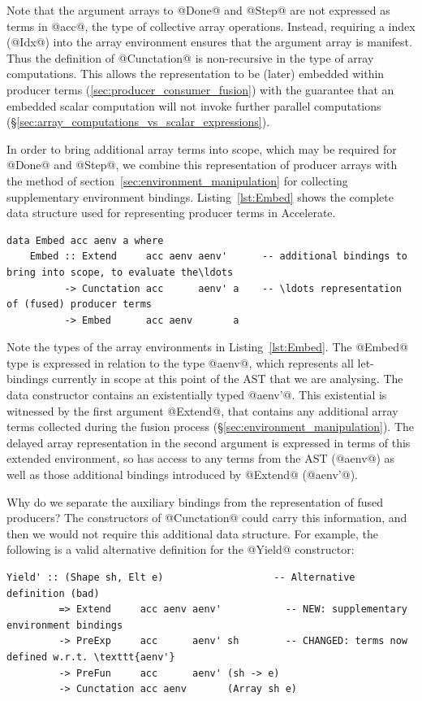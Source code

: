 Note that the argument arrays to @Done@ and @Step@ are not expressed as terms in
@acc@, the type of collective array operations. Instead, requiring a  index (@Idx@) into the array environment ensures that the argument array
is manifest. Thus the definition of @Cunctation@ is non-recursive in the type of
array computations. This allows the representation to be (later) embedded within
producer terms (\ref{sec:producer_consumer_fusion}) with the guarantee that an
embedded scalar computation will not invoke further parallel computations
(\S\ref{sec:array_computations_vs_scalar_expressions}).

In order to bring additional array terms into scope, which may be required for
@Done@ and @Step@, we combine this representation of producer arrays with the
method of section~\ref{sec:environment_manipulation} for collecting
supplementary environment bindings. Listing~\ref{lst:Embed} shows the complete
data structure used for representing producer terms in Accelerate.
%
\begin{lstlisting}[style=haskell_float
    ,label=lst:Embed
    ,caption={Representation of fused producer arrays in Accelerate}]
data Embed acc aenv a where
    Embed :: Extend     acc aenv aenv'      -- additional bindings to bring into scope, to evaluate the\ldots
          -> Cunctation acc      aenv' a    -- \ldots representation of (fused) producer terms
          -> Embed      acc aenv       a
\end{lstlisting}

Note the types of the array environments in Listing~\ref{lst:Embed}. The @Embed@
type is expressed in relation to the type @aenv@, which represents all
let-bindings currently in scope at this point of the AST that we are analysing. The data constructor contains an
existentially typed @aenv'@. This existential is witnessed by the first argument
@Extend@, that contains any additional array terms collected during the fusion
process (\S\ref{sec:environment_manipulation}). The delayed array representation
in the second argument is expressed in terms of this extended environment, so
has access to any terms from the AST (@aenv@) as well as those additional
bindings introduced by @Extend@ (@aenv'@).

Why do we separate the auxiliary bindings from the representation of fused
producers? The constructors of @Cunctation@ could carry this information,
and then we would not require this additional data structure. For example, the
following is a valid alternative definition for the @Yield@ constructor:
%
\begin{lstlisting}[style=haskell]
  Yield' :: (Shape sh, Elt e)                   -- Alternative definition (bad)
         => Extend     acc aenv aenv'           -- NEW: supplementary environment bindings
         -> PreExp     acc      aenv' sh        -- CHANGED: terms now defined w.r.t. \texttt{aenv'}
         -> PreFun     acc      aenv' (sh -> e)
         -> Cunctation acc aenv       (Array sh e)
\end{lstlisting}

